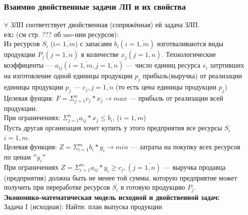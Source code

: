 \subsubsection{Взаимно двойственные задачи ЛП и их свойства}
$\forall$ ЗЛП соответствует двойственная (сопряжённая) ей задача ЗЛП.\\
\textbf{ex:} (см стр. ??? об use-нии ресурсов):\\
Из ресурсов $S_i$ (i= $\overline{1,m}$) с запасами $b_i (i= \overline{1,m})$ изготваливаются виды продукции $P_j (j= \overline{1,n})$ в количестве $x_j (j= \overline{1,n})$. Технологические коэффиценты --- $a_{ij} (i= \overline{1,m}, j= \overline{1,n})$ ---
число единиц ресурса $s_i$ затртивших на изготовление одной единицы продукции $p_j$ прибыль(выручка) от реализации единицы продукции $p_j$ --- $c_j, j= \overline{1,n}$ (то есть цена единицы продукции $p_j$)\\
Целевая фунция: $F = \Sigma_{j=1}^n c_j*x_j \rightarrow max $ --- прибыль от реализации всей продукции. \\
При ограничениях: $\Sigma_{j=1}^n a_{ij}*x_j \leq b_i$, ($i=\overline{1,m}$)\\
Пусть другая организация хочет купить у этого предприятия все ресурсы $S_i$ $i=\overline{1,m}$.\\
Целевая функция: $Z = \Sigma_{i=1}^m b_i*y_i \rightarrow min$ --- затраты на покупку всех ресурсов по ценам $''y_i''$ \\
При ограничениях $Z = \Sigma_{i=1}^m a_{ij}*y_i \geq c_j, (j=\overline{1,n})$ --- выручка продавца (предприятия) должна быть не менее той суммы, которую предприятие может получить при переработке ресурсов $S_i$ в готовую продукцию $P_j$.\\
\textbf{Экономико-математическая модель исходной и двойственной задач:} \\
Задача I (исходная):
Найти: план выпуска продукции 
